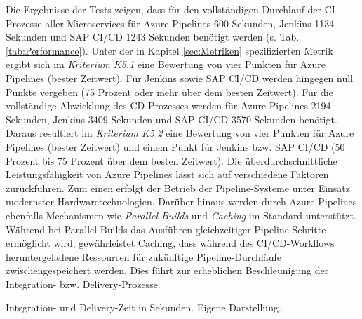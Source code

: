 \vspace*{-15mm}
 Die Ergebnisse der Tests zeigen, dass für den vollständigen Durchlauf der CI-Prozesse aller Microservices für Azure Pipelines 600 Sekunden, Jenkins 1134 Sekunden und SAP CI/CD 1243 Sekunden benötigt werden (s. Tab. \ref{tab:Performance}). Unter der in Kapitel \ref{sec:Metriken} spezifizierten Metrik ergibt sich im \textit{Kriterium K5.1} eine Bewertung von vier Punkten für Azure Pipelines (bester Zeitwert). Für Jenkins sowie SAP CI/CD werden hingegen null Punkte vergeben (75 Prozent oder mehr über dem besten Zeitwert).  Für die vollständige Abwicklung des CD-Prozesses werden für Azure Pipelines 2194 Sekunden, Jenkins 3409 Sekunden und SAP CI/CD 3570 Sekunden benötigt. Daraus resultiert im \textit{Kriterium K5.2} eine Bewertung von vier Punkten für Azure Pipelines (bester Zeitwert) und einem Punkt für Jenkins bzw. SAP CI/CD (50 Prozent bis 75 Prozent über dem besten Zeitwert). Die überdurchschnittliche Leistungsfähigkeit von Azure Pipelines lässt sich auf verschiedene Faktoren zurückführen. Zum einen erfolgt der Betrieb der Pipeline-Systeme unter Einsatz modernster Hardwaretechnologien. Darüber hinaus werden durch Azure Pipelines ebenfalls Mechanismen wie \textit{Parallel Builds} und \textit{Caching} im Standard unterstützt. Während bei Parallel-Builds das Ausführen gleichzeitiger Pipeline-Schritte ermöglicht wird, gewährleistet Caching, dass während des CI/CD-Workflows heruntergeladene Ressourcen für zukünftige Pipeline-Durchläufe zwischengespeichert werden. Dies führt zur erheblichen Beschleunigung der Integration- bzw. Delivery-Prozesse.
 \begin{center}
	\begin{table}[H]
		\centering
		\caption[Integration- und Delivery-Zeit in Sekunden]{Integration- und Delivery-Zeit in Sekunden. Eigene Darstellung.}
		\label{tab:Performance}
	\end{table}
\end{center}
\vspace*{-15mm}
